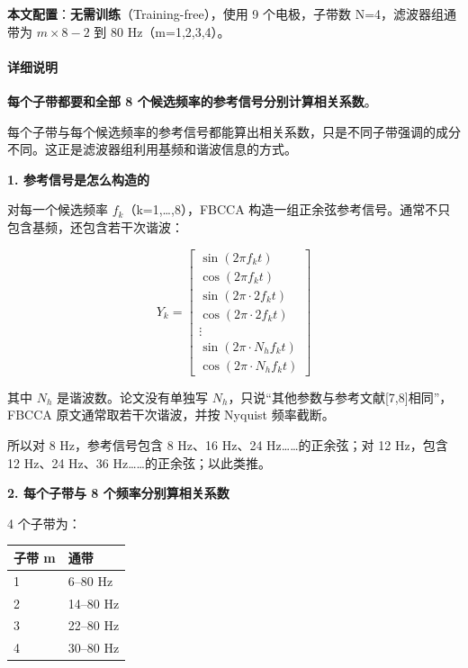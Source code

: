 \documentclass[12pt, a4paper]{ctexart}
\begin{document}
\textbf{本文配置}：\textbf{无需训练}（Training-free），使用 9 个电极，子带数 N=4，滤波器组通带为 $m \times 8 - 2$ 到 $80$ Hz（m=1,2,3,4）。

\paragraph{详细说明}

\textbf{每个子带都要和全部 8 个候选频率的参考信号分别计算相关系数}。

每个子带与每个候选频率的参考信号都能算出相关系数，只是不同子带强调的成分不同。这正是滤波器组利用基频和谐波信息的方式。

\textbf{1. 参考信号是怎么构造的}

对每一个候选频率 $f_k$（k=1,…,8），FBCCA 构造一组正余弦参考信号。通常不只包含基频，还包含若干次谐波：

\begin{equation}
Y_k =\begin{bmatrix}
\sin(2\pi f_k t) \\
\cos(2\pi f_k t) \\
\sin(2\pi \cdot 2f_k t) \\
\cos(2\pi \cdot 2f_k t) \\
\vdots \\
\sin(2\pi \cdot N_h f_k t) \\
\cos(2\pi \cdot N_h f_k t)
\end{bmatrix}
\end{equation}

其中 $N_h$ 是谐波数。论文没有单独写 $N_h$，只说``其他参数与参考文献[7,8]相同''，FBCCA 原文通常取若干次谐波，并按 Nyquist 频率截断。

所以对 8 Hz，参考信号包含 8 Hz、16 Hz、24 Hz……的正余弦；对 12 Hz，包含 12 Hz、24 Hz、36 Hz……的正余弦；以此类推。

\textbf{2. 每个子带与 8 个频率分别算相关系数}

4 个子带为：

\begin{table}[h]
\centering\small
\begin{tabular}{ll}
\toprule
\textbf{子带 m} & \textbf{通带} \\
\midrule
1 & 6--80 Hz \\
2 & 14--80 Hz \\
3 & 22--80 Hz \\
4 & 30--80 Hz \\
\bottomrule
\end{tabular}
\end{table}
\end{document}

